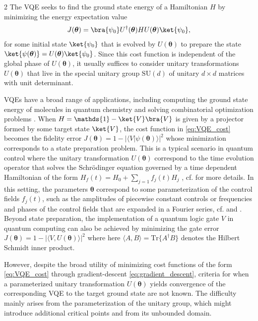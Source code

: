 \documentclass{article}
\renewcommand{\vec}[1]{\ensuremath{\boldsymbol{#1}}}
\begin{document}
\begin{multicols}{2}
The \gls{VQE} seeks to find the ground state energy of a Hamiltonian \(H\) by minimizing the energy expectation value 
\begin{equation}    
\label{eq:VQE_cost}
J(\vec{\theta}) = \bra{\psi_0} U^\dagger(\vec{\theta}) H U(\vec{\theta}) \ket{\psi_0},
\end{equation}
for some initial state \(\ket{\psi_0}\) that is evolved by \(U(\vec{\theta})\) to prepare the state $\ket{\psi(\vec{\theta})}=U(\vec{\theta})\ket{\psi_{0}}$. Since this cost function is independent of the global phase of $U(\vec{\theta})$, it usually suffices to consider unitary transformations $U(\vec{\theta})$ that live in the special unitary group $\mathrm{SU}(d)$ of unitary $d\times d$ matrices with unit determinant.  

VQEs have a broad range of applications, including computing the ground state energy of molecules in quantum chemistry \cite{VQEChem} and solving combinatorial optimization problems \cite{farhi_quantum_2014}. When $H=\mathds{1}-\ket{V}\bra{V}$ is given by a projector formed by some target state $\ket{V}$, the cost function in \eqref{eq:VQE_cost} becomes the fidelity error $J(\vec{\theta})=1-|\langle V|\psi(\vec{\theta}) \rangle |^{2}$ whose minimization corresponds to a state preparation problem. This is a typical scenario in quantum control where the unitary transformation $U(\vec{\theta})$ correspond to the time evolution operator that solves the Schr\"{o}dinger equation governed by a time dependent Hamiltonian of the form 
$ H_f(t) = H_0 + \sum_{j=1} f_j(t) H_j$ \cite{Brif_2010,
doi:10.1126/science.288.5467.824,Koch}, cf.  for more details.
In this setting, the parameters $\vec{\theta}$ correspond to some parameterization of the control fields $f_{j}(t)$, such as the amplitudes of piecewise constant controls \cite{KHANEJA2005296} or frequencies and phases of the control fields that are expanded in a Fourier series, cf. \cite{Müller_2022} and . Beyond state preparation, the implementation of a quantum logic gate $V$ in quantum computing can also be achieved by minimizing the gate error $J(\vec{\theta})=1-|\langle V,U(\vec{\theta})\rangle|^{2}$ where here $\langle A,B\rangle=\text{Tr}\{A^{\dagger}B\}$ denotes the Hilbert Schmidt inner product. 

However, despite the broad utility of minimizing cost functions of the form \eqref{eq:VQE_cost} through gradient-descent \eqref{eq:gradient_descent}, criteria for when a parameterized unitary transformation $U(\vec{\theta})$ yields convergence of the corresponding \gls{VQE} to the target ground state are not known. 
The difficulty mainly arises from the parameterization of the unitary group, which might introduce additional critical points and from its unbounded domain.


\end{multicols}
\end{document}
